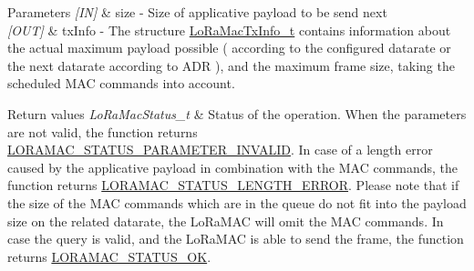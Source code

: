 \begin{DoxyParams}{Parameters}
{\em \mbox{[}\+I\+N\mbox{]}} & size -\/ Size of applicative payload to be send next\\
\hline
{\em \mbox{[}\+O\+U\+T\mbox{]}} & tx\+Info -\/ The structure \hyperlink{group__LORAMAC_ga3219fea2f3c3355f80d2ed29db613683}{Lo\+Ra\+Mac\+Tx\+Info\+\_\+t} contains information about the actual maximum payload possible ( according to the configured datarate or the next datarate according to A\+DR ), and the maximum frame size, taking the scheduled M\+AC commands into account.\\
\hline
\end{DoxyParams}

\begin{DoxyRetVals}{Return values}
{\em Lo\+Ra\+Mac\+Status\+\_\+t} & Status of the operation. When the parameters are not valid, the function returns \hyperlink{group__LORAMAC_gga1d18f26b344040b3ec5c3db662919661ad0d3119f247d00e1787dda106fcb3017}{L\+O\+R\+A\+M\+A\+C\+\_\+\+S\+T\+A\+T\+U\+S\+\_\+\+P\+A\+R\+A\+M\+E\+T\+E\+R\+\_\+\+I\+N\+V\+A\+L\+ID}. In case of a length error caused by the applicative payload in combination with the M\+AC commands, the function returns \hyperlink{group__LORAMAC_gga1d18f26b344040b3ec5c3db662919661a4ab40311dcd2eeffc77f573a919b29b1}{L\+O\+R\+A\+M\+A\+C\+\_\+\+S\+T\+A\+T\+U\+S\+\_\+\+L\+E\+N\+G\+T\+H\+\_\+\+E\+R\+R\+OR}. Please note that if the size of the M\+AC commands which are in the queue do not fit into the payload size on the related datarate, the Lo\+Ra\+M\+AC will omit the M\+AC commands. In case the query is valid, and the Lo\+Ra\+M\+AC is able to send the frame, the function returns \hyperlink{group__LORAMAC_gga1d18f26b344040b3ec5c3db662919661a03db5fca052313edb3823c014b653a74}{L\+O\+R\+A\+M\+A\+C\+\_\+\+S\+T\+A\+T\+U\+S\+\_\+\+OK}. \\
\hline
\end{DoxyRetVals}
